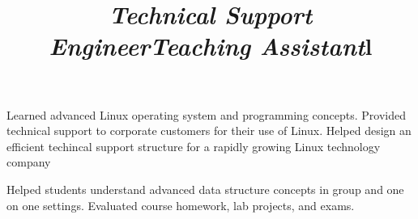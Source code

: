 \begin{resume}

\title{\em Technical Support Engineer}
\begin{position}
Learned advanced Linux operating system and programming concepts.
Provided technical support to corporate customers for their
use of Linux. Helped design an efficient techincal support
structure for a rapidly growing Linux technology company
\end{position}


\title{\em Teaching Assistant}
\begin{position}
Helped students understand advanced data structure concepts in group and 
one on one settings.  Evaluated course homework, lab projects, and exams.
\end{position}


\begin{format}
 \\
\body\\
\end{format}



\begin{format}
\title{l}\\
\\
\\
\body\\
\end{format}



\end{resume}
